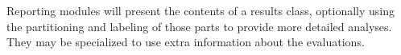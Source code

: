 Reporting modules will present the contents of a results class,
optionally using the partitioning and labeling of those parts
to provide more detailed analyses.
They may be specialized to use extra information about the evaluations.

%
%
%
%

